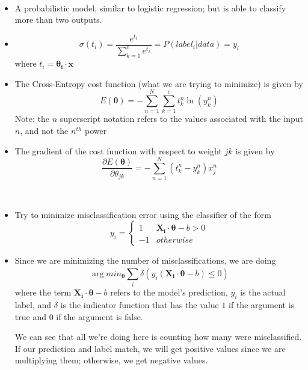 \documentclass[12pt]{article}
\newenvironment{concept}[1]{\begin{trivlist}
		\item[\hskip \labelsep {\bfseries #1}]}{\end{trivlist}}
\begin{document}
\begin{concept}{Softmax Regression}
	\
	\begin{itemize}
		\item {
			A probabilistic model, similar to logistic regression; but is able to classify more than two outputs.
		}
		\item {
			$$\sigma(t_i) = \frac{e^{t_i}}{\sum_{k=1}^{c} e^{t_k}} = P(label_i | data) = y_i$$
			where $t_i = \boldsymbol{\theta_i} \cdot \boldsymbol{x}$
		}
		\item {
			The Cross-Entropy cost function (what we are trying to minimize) is given by
			$$E(\boldsymbol{\theta}) = - \sum_{n=1}^{N} \sum_{k=1}^{c} t_k^n \ln(y_k^n)$$
			Note: the $n$ superscript notation refers to the values associated with the input $n$, and not the $n^{th}$ power
		}
		\item {
			The gradient of the cost function with respect to weight $jk$ is given by
			$$\frac{\partial E(\boldsymbol{\theta})}{\partial \theta_{jk}} = - \sum_{n=1}^{N} (t_k^n - y_k^n) x_j^n$$
		}
	\end{itemize}
\end{concept}

\begin{concept}{Support Vector Machine}
	\
	\begin{itemize}
		\item {
			Try to minimize misclassification error using the classifier of the form
			\[
				y_i =
				\begin{cases}
					1 & \boldsymbol{X_i} \cdot \boldsymbol{\theta} - b > 0 \\
					-1 & otherwise
				\end{cases}
			\]
		}
		\item {
			Since we are minimizing the number of misclassifications, we are doing
			$$\arg min_{\boldsymbol{\theta}} \sum_{i}^{} \delta (y_i (\boldsymbol{X_i} \cdot \boldsymbol{\theta} - b) \leq 0)$$
			where the term $\boldsymbol{X_i} \cdot \boldsymbol{\theta} - b$ refers to the model's prediction, $y_i$ is the actual
			label, and $\delta$ is the indicator function that has the value $1$ if the argument is true and $0$ if the argument is false.
			
			We can see that all we're doing here is counting how many were misclassified. If our prediction and label match, we will get
			positive values since we are multiplying them; otherwise, we get negative values.
		}
	\end{itemize}
\end{concept}
\end{document}
